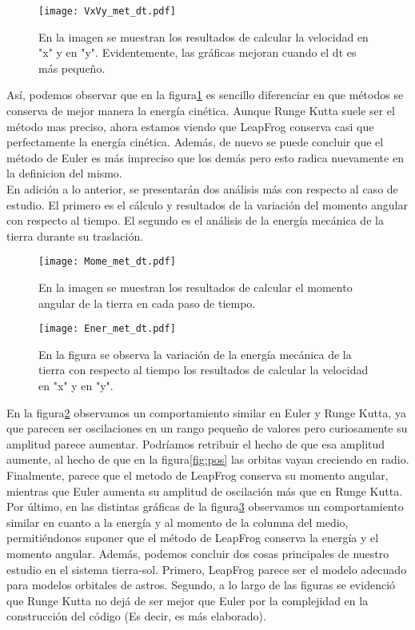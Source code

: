 \documentclass{article}
\begin{document}
\begin{figure}[H]
    \centering
    \texttt{[image: VxVy\_met\_dt.pdf]}
    \caption{En la imagen se muestran los resultados de calcular la velocidad en "x" y en "y". Evidentemente, las gráficas mejoran cuando el dt es más pequeño.}
    \label{fig:vel}
\end{figure}

Así, podemos observar que en la figura\ref{fig:vel} es sencillo diferenciar en que métodos se conserva de mejor manera la energía cinética. Aunque Runge Kutta suele ser el método mas preciso, ahora estamos viendo que LeapFrog conserva casi que perfectamente la energía cinética. Además, de nuevo se puede concluir que el método de Euler es más impreciso que los demás pero esto radica nuevamente en la definicion del mismo.\\

En adición a lo anterior, se presentarán dos análisis más con respecto al caso de estudio. El primero es el cálculo y resultados de la variación del momento angular con respecto al tiempo. El segundo es el análisis de la energía mecánica de la tierra durante su traslación. 

\begin{figure}[H]
    \centering
    \texttt{[image: Mome\_met\_dt.pdf]}
    \caption{En la imagen se muestran los resultados de calcular el momento angular de la tierra en cada paso de tiempo.}
    \label{fig:Mome}
\end{figure}

\begin{figure}[H]
    \centering
    \texttt{[image: Ener\_met\_dt.pdf]}
    \caption{En la figura se observa la variación de la energía mecánica de la tierra con respecto al tiempo los resultados de calcular la velocidad en "x" y en "y".}
    \label{fig:Ene}
\end{figure}
 
En la figura\ref{fig:Mome} observamos un comportamiento similar en Euler y Runge Kutta, ya que parecen ser oscilaciones en un rango pequeño de valores pero curiosamente su amplitud parece aumentar. Podríamos retribuir el hecho de que esa amplitud aumente, al hecho de que en la figura\ref{fig:pos} las orbitas vayan creciendo en radio. Finalmente, parece que el metodo de LeapFrog conserva su momento angular, mientras que Euler aumenta su amplitud de oscilación más que en Runge Kutta.\\

Por último, en las distintas gráficas de la figura\ref{fig:Ene} observamos un comportamiento similar en cuanto a la energía y al momento de la columna del medio, permitiéndonos suponer que el método de LeapFrog conserva la energía y el momento angular. Además, podemos concluir dos cosas principales de nuestro estudio en el sistema tierra-sol. Primero, LeapFrog parece ser el modelo adecuado para modelos orbitales de astros. Segundo, a lo largo de las figuras se evidenció que Runge Kutta no dejá de ser mejor que Euler por la complejidad en la construcción del código (Es decir, es más elaborado).   
\end{document}
